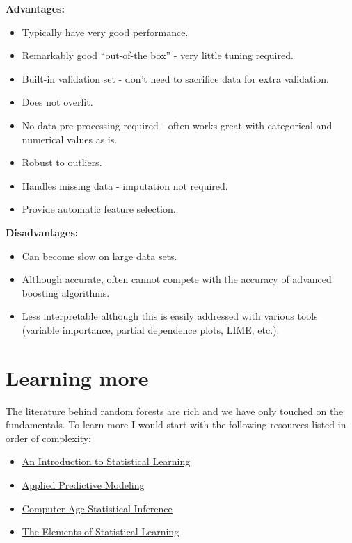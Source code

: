 \documentclass[]{book}
\providecommand{\tightlist}{%
  \setlength{\itemsep}{0pt}\setlength{\parskip}{0pt}}
\theoremstyle{definition}
\theoremstyle{definition}
\theoremstyle{definition}
\theoremstyle{remark}
\begin{document}
\textbf{Advantages:}

\begin{itemize}
\tightlist
\item
  Typically have very good performance.
\item
  Remarkably good ``out-of-the box'' - very little tuning required.
\item
  Built-in validation set - don't need to sacrifice data for extra
  validation.
\item
  Does not overfit.
\item
  No data pre-processing required - often works great with categorical
  and numerical values as is.
\item
  Robust to outliers.
\item
  Handles missing data - imputation not required.
\item
  Provide automatic feature selection.
\end{itemize}

\textbf{Disadvantages:}

\begin{itemize}
\tightlist
\item
  Can become slow on large data sets.
\item
  Although accurate, often cannot compete with the accuracy of advanced
  boosting algorithms.
\item
  Less interpretable although this is easily addressed with various
  tools (variable importance, partial dependence plots, LIME, etc.).
\end{itemize}

\hypertarget{learning-more-4}{%
\section{Learning more}\label{learning-more-4}}

The literature behind random forests are rich and we have only touched
on the fundamentals. To learn more I would start with the following
resources listed in order of complexity:

\begin{itemize}
\tightlist
\item
  \href{http://www-bcf.usc.edu/~gareth/ISL/}{An Introduction to
  Statistical Learning}
\item
  \href{http://appliedpredictivemodeling.com/}{Applied Predictive
  Modeling}
\item
  \href{https://www.amazon.com/Computer-Age-Statistical-Inference-Mathematical/dp/1107149894}{Computer
  Age Statistical Inference}
\item
  \href{https://web.stanford.edu/~hastie/ElemStatLearn/}{The Elements of
  Statistical Learning}
\end{itemize}
\end{document}
